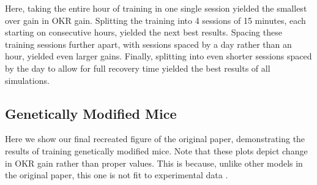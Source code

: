 \documentclass[10pt]{article}
\begin{document}
Here, taking the entire hour of training in one single session yielded the smallest over gain in OKR gain. Splitting the training into 4 sessions of 15 minutes, each starting on consecutive hours, yielded the next best results. Spacing these training sessions further apart, with sessions spaced by a day rather than an hour, yielded even larger gains. Finally, splitting into even shorter sessions spaced by the day to allow for full recovery time yielded the best results of all simulations.

\subsection{Genetically Modified Mice}

Here we show our final recreated figure of the original paper, demonstrating the results of training genetically modified mice. Note that these plots depict change in OKR gain rather than proper values. This is because, unlike other models in the original paper, this one is not fit to experimental data \cite{yamazaki2015modeling}.
\end{document}
